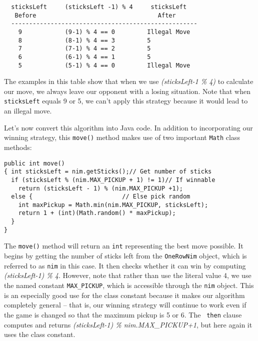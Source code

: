 \begin{jjjlisting}
\begin{lstlisting}
  sticksLeft     (sticksLeft -1) % 4     sticksLeft 
   Before                                  After
  ----------------------------------------------------
    9            (9-1) % 4 == 0         Illegal Move
    8            (8-1) % 4 == 3         5
    7            (7-1) % 4 == 2         5
    6            (6-1) % 4 == 1         5
    5            (5-1) % 4 == 0         Illegal Move
\end{lstlisting}
\end{jjjlisting}

\noindent The examples in this table show that when we use {\it (sticksLeft-1 \% 4)}
to calculate our move, we always leave our opponent with a losing
situation.  Note that when {\tt sticksLeft} equals 9 or 5, we can't
apply this strategy because it would lead to an illegal move.

Let's now convert this algorithm into Java code. In addition to incorporating
our winning strategy, this {\tt move()} method makes use of two important
{\tt Math} class methods:

\begin{jjjlisting}
\begin{lstlisting}
public int move() 
{ int sticksLeft = nim.getSticks();// Get number of sticks
  if (sticksLeft % (nim.MAX_PICKUP + 1) != 1)// If winnable
    return (sticksLeft - 1) % (nim.MAX_PICKUP +1);
  else {                         // Else pick random
    int maxPickup = Math.min(nim.MAX_PICKUP, sticksLeft);
    return 1 + (int)(Math.random() * maxPickup);
  }
}
\end{lstlisting}
\end{jjjlisting}

\noindent The {\tt move()} method will return an {\tt int} representing the
best move possible. It begins by getting the number of sticks left
from the {\tt OneRowNim} object, which is referred to as {\tt nim} in
this case.  It then checks whether it can win by computing {\it
(sticksLeft-1) \% 4}. However, note that rather than use the literal
value 4, we use the named constant {\tt MAX\_PICKUP}, which is
accessible through the {\tt nim} object.  This is an especially good
use for the class constant because it makes our algorithm completely
general -- that is, our winning strategy will continue to work even if
the game is changed so that the maximum pickup is 5 or 6. The {\tt
then} clause computes and returns {\it (sticksLeft-1) \%
nim.MAX\_PICKUP+1}, but here again it uses the class constant.

